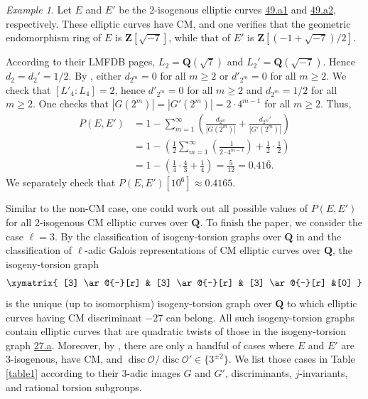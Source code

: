 \documentclass{amsart}
\newcommand{\Z}{\mathbf{Z}}
\newcommand{\Q}{\mathbf{Q}}
\newcommand{\disc}{\operatorname{disc}}
\numberwithin{equation}{section}
\theoremstyle{plain}
\theoremstyle{remark}
\newtheorem{exm}[equation]{Example}
\begin{document}
\begin{exm}
Let $E$ and $E'$ be the 2-isogenous elliptic curves  \href{https://www.lmfdb.org/EllipticCurve/Q/49/a/1}{49.a1} and \href{https://www.lmfdb.org/EllipticCurve/Q/49/a/2}{49.a2}, respectively. These elliptic curves have CM, and one verifies that the geometric endomorphism ring of $E$ is $\Z[\sqrt{-7}]$, while that of $E'$ is $\Z[(-1 + \sqrt{-7})/2]$.  

According to their LMFDB pages, $L_2 = \Q(\sqrt{7})$ and $L_2' = \Q(\sqrt{-7})$.  Hence $d_2 = d_2' = 1/2$.  By \cite[Prop.~6.1]{rnt}, either $d_{2^m}=0$ for all $m\geq 2$ or $d'_{2^m} =0$ for all $m \geq 2$.  We check that $[L'_{4}:L_4] = 2$, hence $d'_{2^m} = 0$ for all $m\geq 2$ and $d_{2^m} = 1/2$ for all $m\geq 2$.   One checks that $|G(2^m)| = |G'(2^m)| = 2 \cdot 4^{m-1}$ for all $m\geq 2$.  Thus,
\begin{align*}
P(E,E') &= 1 - \sum_{m=1}^{\infty} \left( \frac{d_{2^m}}{|G(2^m)|} + \frac{d_{2^m}'}{|G'(2^m)|} \right) \\
&= 1 - \left( \frac{1}{2} \sum_{m=1}^\infty \left(\frac{1}{2\cdot 4^{m-1}}\right) + \frac{1}{2} \cdot \frac{1}{2} \right) \\
&= 1 - \left( \frac{1}{4} \cdot \frac{4}{3} + \frac{1}{4}\right) = \frac{5}{12} =0.41\overline{6}.
\end{align*}
We separately check that $P(E,E')[10^6] \approx 0.4165$.
\end{exm}

Similar to the non-CM case, one could work out all possible values of $P(E,E')$ for all  2-isogenous CM elliptic curves over $\Q$.  To finish the paper, we consider the case $\ell=3$.  By the classification of isogeny-torsion graphs over $\Q$ in \cite{chil} and the classification of $\ell$-adic Galois representations of CM elliptic curves over $\Q$, the isogeny-torsion graph 
\[
\xymatrix{
[3] \ar@{-}[r] & [3] \ar@{-}[r] & [3] \ar@{-}[r]  &[0]
}
\]
is the unique (up to isomorphism) isogeny-torsion graph over $\Q$ to which elliptic curves having CM discriminant $-27$ can belong.   All such isogeny-torsion graphs contain elliptic curves that are quadratic twists of those in the isogeny-torsion graph \href{https://beta.lmfdb.org/EllipticCurve/Q/27/a/}{27.a}.  Moreover, by \cite[Thm.~1.2, 1.4]{alvaro}, there are only a handful of cases where $E$ and $E'$ are 3-isogenous, have CM, and $\disc \mathcal{O}/\disc \mathcal{O}' \in \lbrace 3^{\pm 2} \rbrace$.  We list those cases in Table \ref{table1} according to their 3-adic images $G$ and $G'$, discriminants, $j$-invariants, and rational torsion subgroups.
\end{document}
